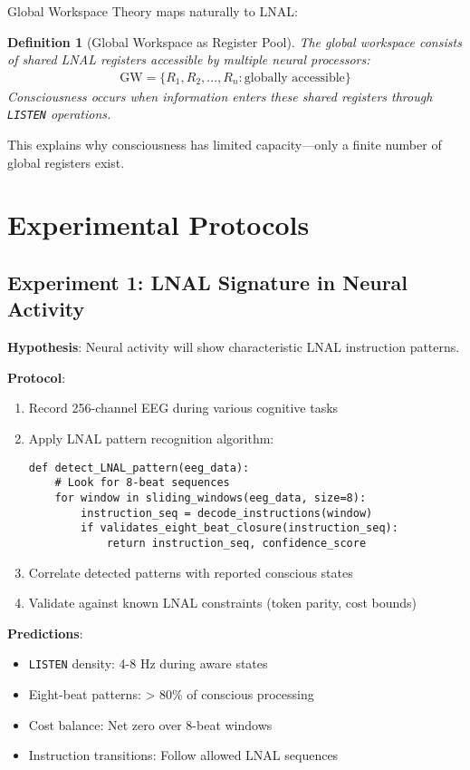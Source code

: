 \documentclass[12pt,a4paper]{article}
\newtheorem{definition}[theorem]{Definition}
\newcommand{\opcmd}[1]{\texttt{#1}}
\begin{document}
Global Workspace Theory \cite{baars1988cognitive} maps naturally to LNAL:

\begin{definition}[Global Workspace as Register Pool]
The global workspace consists of shared LNAL registers accessible by multiple neural processors:
\begin{align}
\text{GW} = \{R_1, R_2, ..., R_n : \text{globally accessible}\}
\end{align}
Consciousness occurs when information enters these shared registers through \opcmd{LISTEN} operations.
\end{definition}

This explains why consciousness has limited capacity—only a finite number of global registers exist.

\section{Experimental Protocols}

\subsection{Experiment 1: LNAL Signature in Neural Activity}

\textbf{Hypothesis}: Neural activity will show characteristic LNAL instruction patterns.

\textbf{Protocol}:
\begin{enumerate}
\item Record 256-channel EEG during various cognitive tasks
\item Apply LNAL pattern recognition algorithm:
\begin{lstlisting}
def detect_LNAL_pattern(eeg_data):
    # Look for 8-beat sequences
    for window in sliding_windows(eeg_data, size=8):
        instruction_seq = decode_instructions(window)
        if validates_eight_beat_closure(instruction_seq):
            return instruction_seq, confidence_score
\end{lstlisting}
\item Correlate detected patterns with reported conscious states
\item Validate against known LNAL constraints (token parity, cost bounds)
\end{enumerate}

\textbf{Predictions}:
\begin{itemize}
\item \opcmd{LISTEN} density: 4-8 Hz during aware states
\item Eight-beat patterns: > 80\% of conscious processing
\item Cost balance: Net zero over 8-beat windows
\item Instruction transitions: Follow allowed LNAL sequences
\end{itemize}
\end{document}
